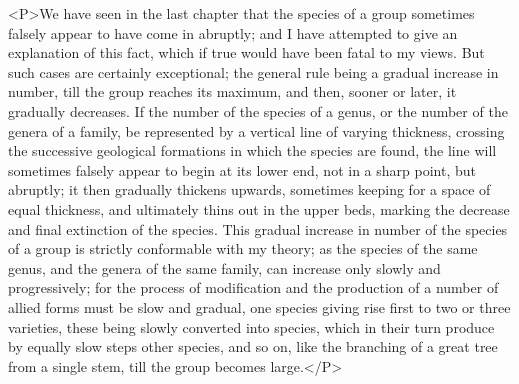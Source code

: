 <P>We have seen in the last chapter that the species of a group sometimes falsely appear to have come in abruptly; and I have attempted to give an explanation of this fact, which if true would have been fatal to my views. But such cases are certainly exceptional; the general rule being a gradual increase in number, till the group reaches its maximum, and then, sooner or later, it gradually decreases. If the number of the species of a genus, or the number of the genera of a family, be represented by a vertical line of varying thickness, crossing the successive geological formations in which the species are found, the line will sometimes falsely appear to begin at its lower end, not in a sharp point, but abruptly; it then gradually thickens upwards, sometimes keeping for a space of equal thickness, and ultimately thins out in the upper beds, marking the decrease and final extinction of the species. This gradual increase in number of the species of a group is strictly conformable with my theory; as the species of the same genus, and the genera of the same family, can increase only slowly and progressively; for the process of modification and the production of a number of allied forms must be slow and gradual, one species giving rise first to two or three varieties, these being slowly converted into species, which in their turn produce by equally slow steps other species, and so on, like the branching of a great tree from a single stem, till the group becomes large.</P>

